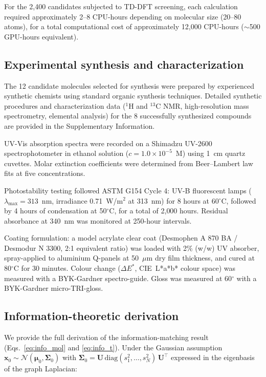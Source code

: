 \documentclass[11pt]{article}
\newcommand{\vx}{\mathbf{x}}
\newcommand{\mU}{\mathbf{U}}
\newcommand{\normal}{\mathcal{N}}
\begin{document}
For the 2{,}400 candidates subjected to TD-DFT screening, each calculation required approximately 2--8 CPU-hours depending on molecular size (20--80 atoms), for a total computational cost of approximately 12{,}000 CPU-hours ($\sim$500 GPU-hours equivalent).


\subsection*{Experimental synthesis and characterization}

The 12 candidate molecules selected for synthesis were prepared by experienced synthetic chemists using standard organic synthesis techniques. Detailed synthetic procedures and characterization data ($^1$H and $^{13}$C NMR, high-resolution mass spectrometry, elemental analysis) for the 8 successfully synthesized compounds are provided in the Supplementary Information.

UV-Vis absorption spectra were recorded on a Shimadzu UV-2600 spectrophotometer in ethanol solution ($c = 1.0 \times 10^{-5}$~M) using 1~cm quartz cuvettes. Molar extinction coefficients were determined from Beer--Lambert law fits at five concentrations.

Photostability testing followed ASTM G154 Cycle 4: UV-B fluorescent lamps ($\lambda_{\max} = 313$~nm, irradiance 0.71~W/m$^2$ at 313~nm) for 8 hours at 60$^\circ$C, followed by 4 hours of condensation at 50$^\circ$C, for a total of 2{,}000 hours. Residual absorbance at 340~nm was monitored at 250-hour intervals.

Coating formulation: a model acrylate clear coat (Desmophen A 870 BA / Desmodur N 3300, 2:1 equivalent ratio) was loaded with 2\% (w/w) UV absorber, spray-applied to aluminium Q-panels at 50~$\mu$m dry film thickness, and cured at 80$^\circ$C for 30 minutes. Colour change ($\Delta E^*$, CIE~L*a*b* colour space) was measured with a BYK-Gardner spectro-guide. Gloss was measured at 60$^\circ$ with a BYK-Gardner micro-TRI-gloss.


\subsection*{Information-theoretic derivation}

We provide the full derivation of the information-matching result (Eqs.~\eqref{eq:info_mol} and \eqref{eq:info_t}). Under the Gaussian assumption $\vx_0 \sim \normal(\boldsymbol{\mu}_0, \boldsymbol{\Sigma}_0)$ with $\boldsymbol{\Sigma}_0 = \mU\,\text{diag}(s_1^2, \ldots, s_N^2)\,\mU^\top$ expressed in the eigenbasis of the graph Laplacian:
\end{document}
